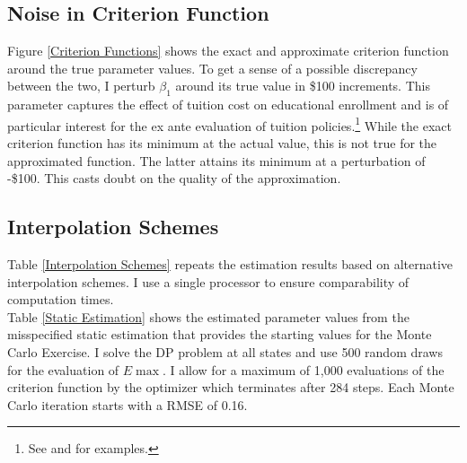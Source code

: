 \subsection{Noise in Criterion Function}\label{Noise in Criterion Function}
Figure \ref{Criterion Functions} shows the exact and approximate criterion function around the true parameter values. To get a sense of a possible discrepancy between the two, I perturb $\beta_1$ around its true value in \$100 increments. This parameter captures the effect of tuition cost on educational enrollment and is of particular interest for the ex ante evaluation of tuition policies.\footnote{See \citet{Keane.1997} and \citet{Keane.2001} for examples.} While the exact criterion function has its minimum at the actual value, this is not true for the approximated function. The latter attains its minimum at a perturbation of -\$100. This casts doubt on the quality of the approximation. 
\subsection{Interpolation Schemes}
Table \ref{Interpolation Schemes} repeats the estimation results based on alternative interpolation schemes. I use a single processor to ensure comparability of computation times.
\\\newline
%
Table \ref{Static Estimation} shows the estimated parameter values from the misspecified static estimation that provides the starting values for the Monte Carlo Exercise. I solve the DP problem at all states and use 500 random draws for the evaluation of $E\max$. I allow for a maximum of 1,000 evaluations of the criterion function by the optimizer which terminates after 284 steps. Each Monte Carlo iteration starts with a RMSE of 0.16.
